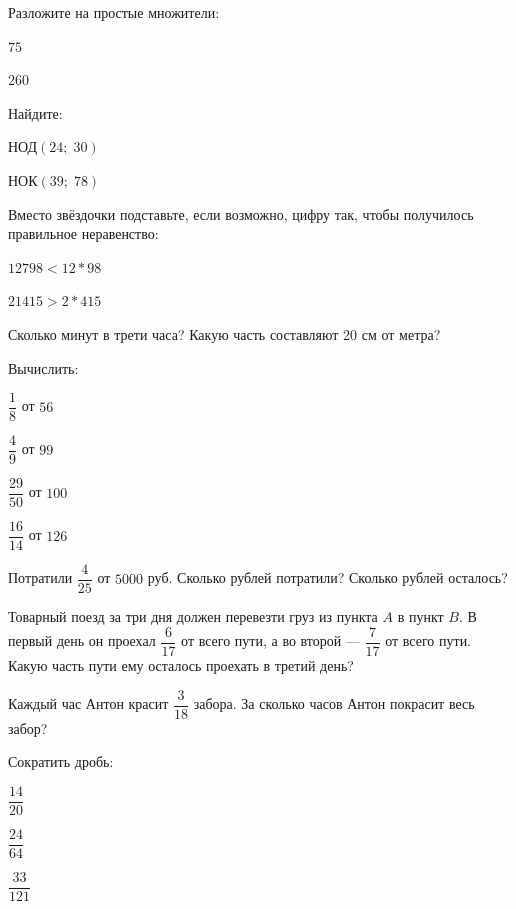 \begin{listofex}
	\item Разложите на простые множители:
	\begin{enumcols}[itemcolumns=2]
		\item \( 75 \)
		\item \( 260 \)
	\end{enumcols}
	\item Найдите:
	\begin{enumcols}[itemcolumns=2]
		\item НОД\( (24;\;30) \)
		\item НОК\( (39;\;78) \)
	\end{enumcols}
	\item Вместо звёздочки подставьте, если возможно, цифру так, чтобы получилось правильное
	неравенство:
	\begin{enumcols}[itemcolumns=2]
		\item \( 12798 < 12*98 \)
		\item \( 21415 > 2*415 \)
	\end{enumcols}
	\item Сколько минут в трети часа? Какую часть составляют 20 см от метра?
	\item Вычислить:
	\begin{enumcols}[itemcolumns=4]
		\item \( \dfrac{1}{8} \) от \( 56 \)
		\item \( \dfrac{4}{9} \) от \( 99 \)
		\item \( \dfrac{29}{50} \) от \( 100 \)
		\item \( \dfrac{16}{14} \) от \( 126 \)
	\end{enumcols}
	\item Потратили \( \dfrac{4}{25} \) от \( 5000 \) руб. Сколько рублей потратили? Сколько рублей осталось?
	\item Товарный поезд за три дня должен перевезти груз из пункта \( A \) в пункт \( B \). В первый день он проехал \( \dfrac{6}{17} \) от всего пути, а во второй --- \( \dfrac{7}{17} \) от всего пути. Какую часть пути ему осталось проехать в третий день?
	\item Каждый час Антон красит \( \dfrac{3}{18} \) забора. За сколько часов Антон покрасит весь забор?
	\item Сократить дробь:
	\begin{enumcols}[itemcolumns=5]
		\item \( \dfrac{14}{20} \)
		\item \( \dfrac{24}{64} \)
		\item \( \dfrac{33}{121} \)

\end{enumcols}
\end{listofex}
